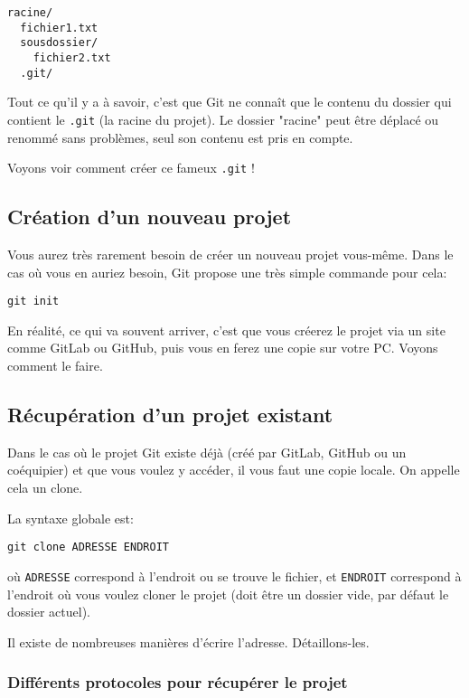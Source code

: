 \documentclass[10pt,a4paper]{article}
\begin{document}
\begin{verbatim}
racine/
  fichier1.txt
  sousdossier/
    fichier2.txt
  .git/
\end{verbatim}

Tout ce qu'il y a à savoir, c'est que Git ne connaît que le contenu du dossier qui contient le {\tt .git} (la racine du projet). Le dossier "racine" peut être déplacé ou renommé sans problèmes, seul son contenu est pris en compte.

Voyons voir comment créer ce fameux {\tt .git} !

\subsection{Création d'un nouveau projet}

Vous aurez très rarement besoin de créer un nouveau projet vous-même. Dans le cas où vous en auriez besoin, Git propose une très simple commande pour cela:

\begin{verbatim}
git init
\end{verbatim}

En réalité, ce qui va souvent arriver, c'est que vous créerez le projet via un site comme GitLab ou GitHub, puis vous en ferez une copie sur votre PC. Voyons comment le faire.

\subsection{Récupération d'un projet existant}

Dans le cas où le projet Git existe déjà (créé par GitLab, GitHub ou un coéquipier) et que vous voulez y accéder, il vous faut une copie locale. On appelle cela un clone.

La syntaxe globale est:

\begin{verbatim}
git clone ADRESSE ENDROIT
\end{verbatim}

où {\tt ADRESSE} correspond à l'endroit ou se trouve le fichier, et {\tt ENDROIT} correspond à l'endroit où vous voulez cloner le projet (doit être un dossier vide, par défaut le dossier actuel).

Il existe de nombreuses manières d'écrire l’adresse. Détaillons-les.

\subsubsection[Différents protocoles]{Différents protocoles pour récupérer le projet}
\end{document}
